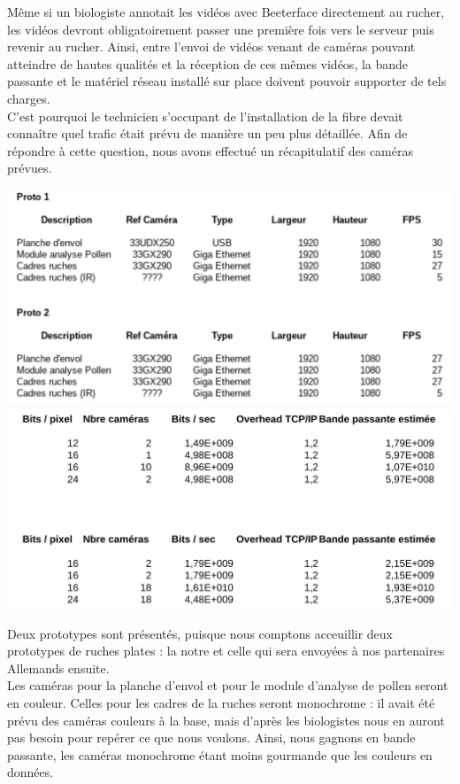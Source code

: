 \documentclass[11pt,french,a4paper]{report}
\begin{document}
Même si un biologiste annotait les vidéos avec Beeterface directement au rucher, les vidéos devront obligatoirement passer une première 
fois vers le serveur puis revenir au rucher. Ainsi, entre l'envoi de vidéos venant de caméras pouvant atteindre de hautes
qualités et la réception de ces mêmes vidéos, la bande passante et le matériel réseau installé sur place 
doivent pouvoir supporter de tels charges. \\

C'est pourquoi le technicien s'occupant de l'installation de la fibre devait connaître quel trafic était prévu de manière un
peu plus détaillée. Afin de répondre à cette question, nous avons effectué un récapitulatif des caméras prévues. 


\includegraphics[scale=0.2]{../images/annexes/camera_bp.png} 
\includegraphics[scale=0.2]{../images/annexes/camera_bp2.png} 

Deux prototypes sont présentés, puisque nous comptons acceuillir deux prototypes de ruches plates : la notre et 
celle qui sera envoyées à nos partenaires Allemands ensuite. \\

Les caméras pour la planche d'envol et pour le module d'analyse de pollen seront en couleur. Celles pour les cadres de la ruches
seront monochrome : il avait été prévu des caméras couleurs à la base, mais d'après les biologistes nous en auront pas besoin pour 
repérer ce que nous voulons. Ainsi, nous gagnons en bande passante, les caméras monochrome étant moins gourmande que les couleurs 
en données. \\
\end{document}
